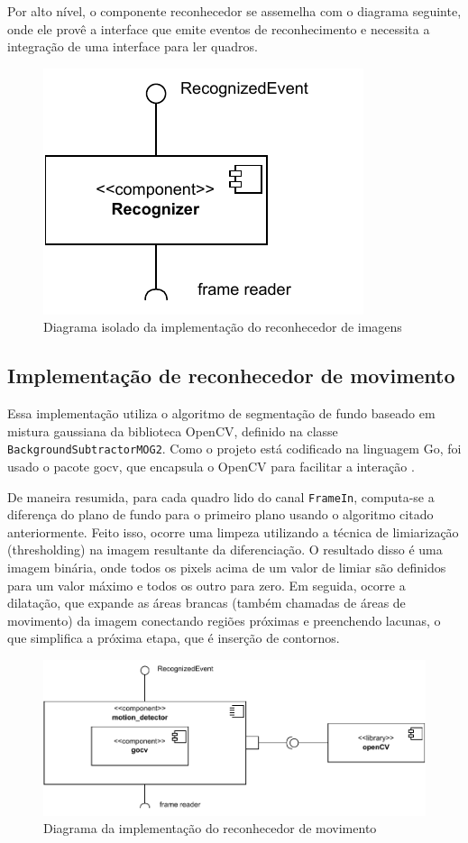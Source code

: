 \documentclass[12pt, %
openright, 
oneside, %
a4paper,    %
brazil]{facom-ufu-abntex2}
\begin{document}
Por alto nível, o componente reconhecedor se assemelha com o diagrama seguinte,
onde ele provê a interface que emite eventos de reconhecimento e necessita a
integração de uma interface para ler quadros.

\begin{figure}[!ht]
	\centering
	\includegraphics[width=0.4\linewidth]{recognizer.pdf}
	\caption[Diagrama isolado da implementação do reconhecedor de
		imagens]{Diagrama isolado da implementação do reconhecedor de imagens}
	\label{fig:graficosVariandoTamanhoRede}
\end{figure}

\subsection{Implementação de reconhecedor de movimento}
Essa implementação utiliza o algoritmo de segmentação de fundo baseado em
mistura gaussiana da biblioteca OpenCV, definido na classe
\texttt{BackgroundSubtractorMOG2}. Como o projeto está codificado na linguagem
Go, foi usado o pacote gocv, que encapsula o OpenCV para facilitar a interação
\cite{gocv_package}.

De maneira resumida, para cada quadro lido do canal \texttt{FrameIn},
computa-se a diferença do plano de fundo para o primeiro plano usando o
algoritmo citado anteriormente. Feito isso, ocorre uma limpeza utilizando a
técnica de limiarização (thresholding) na imagem resultante da diferenciação. O
resultado disso é uma imagem binária, onde todos os pixels acima de um valor de
limiar são definidos para um valor máximo e todos os outro para zero. Em
seguida, ocorre a dilatação, que expande as áreas brancas (também chamadas de
áreas de movimento) da imagem conectando regiões próximas e preenchendo
lacunas, o que simplifica a próxima etapa, que é inserção de contornos.

\clearpage

\begin{figure}[!ht]
	\centering
	\includegraphics[width=1.0\linewidth]{motion_detector.pdf}
	\caption[Diagrama da implementação do reconhecedor de
		movimento]{Diagrama da implementação do reconhecedor de movimento}
	\label{fig:graficosVariandoTamanhoRede}
\end{figure}
\end{document}
